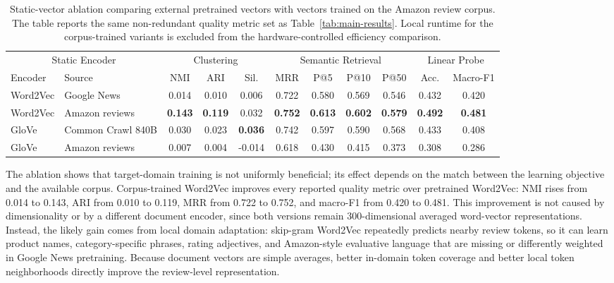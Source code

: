 \documentclass{article}
\begin{document}
\begin{table}[t]
\centering
\footnotesize
\begin{tabular*}{\textwidth}{@{\extracolsep{\fill}}llccccccccc@{}}
\toprule
\multicolumn{2}{c}{Static Encoder} & \multicolumn{3}{c}{Clustering} & \multicolumn{4}{c}{Semantic Retrieval} & \multicolumn{2}{c}{Linear Probe} \\
\cmidrule(lr){1-2}\cmidrule(lr){3-5}\cmidrule(lr){6-9}\cmidrule(l){10-11}
Encoder & Source & NMI & ARI & Sil. & MRR & P@5 & P@10 & P@50 & Acc. & Macro-F1 \\
\midrule
Word2Vec & Google News & 0.014 & 0.010 & 0.006 & 0.722 & 0.580 & 0.569 & 0.546 & 0.432 & 0.420 \\
Word2Vec & Amazon reviews & \textbf{0.143} & \textbf{0.119} & 0.032 & \textbf{0.752} & \textbf{0.613} & \textbf{0.602} & \textbf{0.579} & \textbf{0.492} & \textbf{0.481} \\
GloVe & Common Crawl 840B & 0.030 & 0.023 & \textbf{0.036} & 0.742 & 0.597 & 0.590 & 0.568 & 0.433 & 0.408 \\
GloVe & Amazon reviews & 0.007 & 0.004 & -0.014 & 0.618 & 0.430 & 0.415 & 0.373 & 0.308 & 0.286 \\
\bottomrule
\end{tabular*}
\caption{Static-vector ablation comparing external pretrained vectors with vectors trained on the Amazon review corpus. The table reports the same non-redundant quality metric set as Table~\ref{tab:main-results}. Local runtime for the corpus-trained variants is excluded from the hardware-controlled efficiency comparison.}
\label{tab:static-ablation}
\end{table}

The ablation shows that target-domain training is not uniformly beneficial; its effect depends on the match between the learning objective and the available corpus. Corpus-trained Word2Vec improves every reported quality metric over pretrained Word2Vec: NMI rises from 0.014 to 0.143, ARI from 0.010 to 0.119, MRR from 0.722 to 0.752, and macro-F1 from 0.420 to 0.481. This improvement is not caused by dimensionality or by a different document encoder, since both versions remain 300-dimensional averaged word-vector representations. Instead, the likely gain comes from local domain adaptation: skip-gram Word2Vec repeatedly predicts nearby review tokens, so it can learn product names, category-specific phrases, rating adjectives, and Amazon-style evaluative language that are missing or differently weighted in Google News pretraining. Because document vectors are simple averages, better in-domain token coverage and better local token neighborhoods directly improve the review-level representation.
\end{document}
